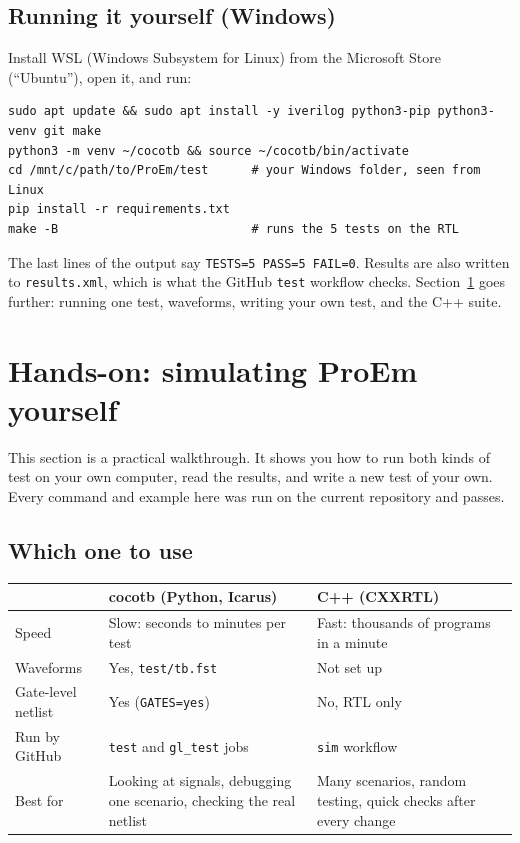 \documentclass[11pt,a4paper]{article}
\newcommand{\file}[1]{\texttt{#1}}
\newcommand{\cmd}[1]{\texttt{#1}}
\begin{document}
\subsection{Running it yourself (Windows)}

Install WSL (Windows Subsystem for Linux) from the Microsoft Store (``Ubuntu''), open it, and run:

\begin{lstlisting}
sudo apt update && sudo apt install -y iverilog python3-pip python3-venv git make
python3 -m venv ~/cocotb && source ~/cocotb/bin/activate
cd /mnt/c/path/to/ProEm/test      # your Windows folder, seen from Linux
pip install -r requirements.txt
make -B                           # runs the 5 tests on the RTL
\end{lstlisting}

The last lines of the output say \texttt{TESTS=5 PASS=5 FAIL=0}. Results are also written to \file{results.xml}, which is what the GitHub \cmd{test} workflow checks. Section~\ref{sec:handson} goes further: running one test, waveforms, writing your own test, and the C++ suite.

\section{Hands-on: simulating ProEm yourself}\label{sec:handson}

This section is a practical walkthrough. It shows you how to run both kinds of test on your own computer, read the results, and write a new test of your own. Every command and example here was run on the current repository and passes.

\subsection{Which one to use}

\begin{center}
\begin{tabularx}{\linewidth}{@{}lXX@{}}
\toprule
 & cocotb (Python, Icarus) & C++ (CXXRTL) \\
\midrule
Speed & Slow: seconds to minutes per test & Fast: thousands of programs in a minute \\
Waveforms & Yes, \file{test/tb.fst} & Not set up \\
Gate-level netlist & Yes (\texttt{GATES=yes}) & No, RTL only \\
Run by GitHub & \cmd{test} and \cmd{gl\_test} jobs & \cmd{sim} workflow \\
Best for & Looking at signals, debugging one scenario, checking the real netlist & Many scenarios, random testing, quick checks after every change \\
\bottomrule
\end{tabularx}
\end{center}
\end{document}
